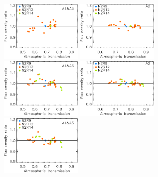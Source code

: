 \begin{figure}[ht!]
\begin{center}
  \includegraphics[clip=true, trim={0, -0.3cm, -0.3cm, 0}, width=0.35\textwidth]{Figures/Calibration/plot_flux_density_ratio_obstau_uranus_skydip_narrow_1mm.pdf}
  \includegraphics[clip=true, trim={0, -0.3cm, -0.3cm, 0}, width=0.35\textwidth]{Figures/Calibration/plot_flux_density_ratio_obstau_uranus_skydip_narrow_a2.pdf}
  \includegraphics[clip=true, trim={0, -0.3cm, -0.3cm, 0}, width=0.35\textwidth]{Figures/Calibration/plot_flux_density_ratio_obstau_uranus_corrected_skydip_photocorr_demo_narrow_1mm.pdf}
  \includegraphics[clip=true, trim={0, -0.3cm, -0.3cm, 0}, width=0.35\textwidth]{Figures/Calibration/plot_flux_density_ratio_obstau_uranus_corrected_skydip_photocorr_demo_narrow_a2.pdf}
  \includegraphics[clip=true, trim={0, -0.3cm, -0.3cm, 0}, width=0.35\textwidth]{Figures/Calibration/plot_flux_density_ratio_obstau_uranus_corrected_skydip_photocorr_pointing_narrow_1mm.pdf}

\end{center}
\end{figure}
